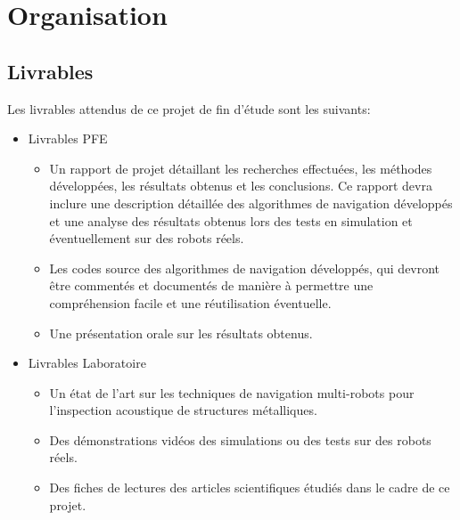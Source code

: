 \documentclass[init,francais,RandD]{rapportPFE}
\begin{document}
	\section{Organisation}
		\subsection{Livrables}
			Les livrables attendus de ce projet de fin d'étude sont les suivants:
			\begin{itemize}
				\item Livrables PFE
				\begin{itemize}
					\item Un rapport de projet détaillant les recherches effectuées, les méthodes développées, les résultats obtenus et les conclusions. Ce rapport devra inclure une description détaillée des algorithmes de navigation développés et une analyse des résultats obtenus lors des tests en simulation et éventuellement sur des robots réels.
					\item Les codes source des algorithmes de navigation développés, qui devront être commentés et documentés de manière à permettre une compréhension facile et une réutilisation éventuelle.
					\item Une présentation orale sur les résultats obtenus.
				\end{itemize}
				\item Livrables Laboratoire
				\begin{itemize}
					\item Un état de l'art sur les techniques de navigation multi-robots pour l'inspection acoustique de structures métalliques.
					\item Des démonstrations vidéos des simulations ou des tests sur des robots réels.
					\item Des fiches de lectures des articles scientifiques étudiés dans le cadre de ce projet.
				\end{itemize}
			\end{itemize}
\end{document}
